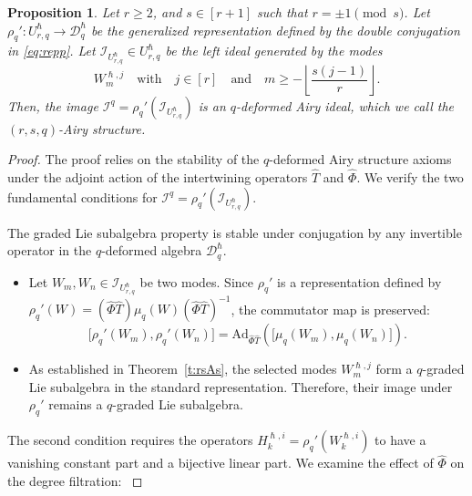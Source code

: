 \documentclass[reqno,11pt]{amsart}
\theoremstyle{plain}
\newtheorem{proposition}[theorem]{Proposition}
\theoremstyle{definition}
\theoremstyle{remark}
\numberwithin{equation}{section}
\newcommand{\1}{\mathds{1}}
\newcommand{\2}{\frac{1}{2}}
\begin{document}
{				\begin{proposition}\label{p:rsAsgen}
					Let $ r \geq 2$, and $ s \in [r+1]$ such that $ r = \pm 1 \pmod{s}$. Let $\rho_q': U^\hslash_{r,q} \to \mathcal{D}_{q}^\hslash$ be the generalized representation defined by the double conjugation in \eqref{eq:repp}. Let $\mathcal{I}_{U_{r,q}^\hslash} \in U^\hslash_{r,q}$ be the left ideal generated by the  modes 
					\begin{equation}
						W^{\hslash,j}_m \quad \text{with} \quad j \in [r] \quad \text{and} \quad m \geq - \left\lfloor \frac{s(j-1)}{r} \right\rfloor.
					\end{equation}
					Then, the image $\mathcal{I}^q = \rho_q'(\mathcal{I}_{U_{r,q}^\hslash})$
					is an $q$-deformed Airy ideal, which we call the  $(r,s,q)$-Airy structure.
				\end{proposition}
				\begin{proof}
					{The proof relies on the stability of the $q$-deformed Airy structure axioms under the adjoint action of the intertwining operators $\hat{T}$ and $\hat{\Phi}$. We verify the two fundamental conditions for $\mathcal{I}^q = \rho_q'(\mathcal{I}_{U_{r,q}^\hslash})$.}
					{The graded Lie subalgebra property is stable under conjugation by any invertible operator in the $q$-deformed 
						algebra $\mathcal{D}_q^\hslash$. 
						\begin{itemize}
							\item[(i)] Let $W_m, W_n \in \mathcal{I}_{U_{r,q}^\hslash}$ be two modes. Since $\rho_q'$ is a representation defined by $\rho_q'(W) = (\hat{\Phi} \hat{T}) \mu_q(W) (\hat{\Phi} \hat{T})^{-1}$, the commutator map is preserved:
							\begin{equation}
								\big[\rho_q'(W_m), \rho_q'(W_n)\big] = \text{Ad}_{\hat{\Phi} \hat{T}} \left( \big[\mu_q(W_m), \mu_q(W_n)\big] \right).
							\end{equation}
							\item[(ii)] As established in Theorem~\ref{t:rsAs}, the selected modes $W^{\hslash,j}_m$ form a $q$-graded Lie subalgebra in the standard representation. Therefore, their image under $\rho_q'$ remains a $q$-graded Lie subalgebra.
					\end{itemize}}
					{The second condition requires the operators $H^{\hslash,i}_k = \rho_q'(W^{\hslash,i}_k)$ to have a vanishing constant part and a bijective linear part. We examine the effect of $\hat{\Phi}$ on the degree filtration:
}
\end{proof}}
\end{document}
